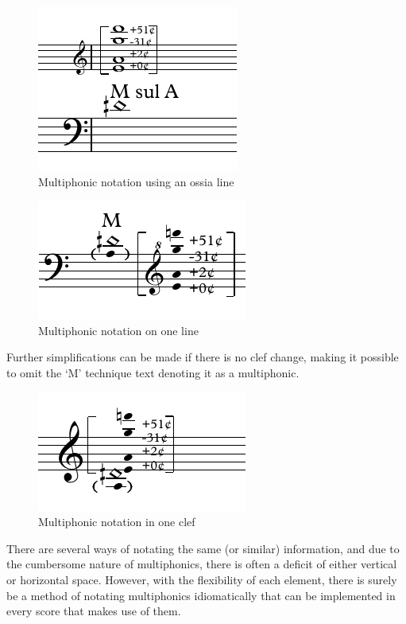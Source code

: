 \begin{figure}
  \centering
  \includegraphics{./resources/multiphonicNotationOssia.pdf}
  \caption{Multiphonic notation using an ossia line}\label{fig:multiphonicNotationOssia}
\end{figure}

\begin{figure}
  \centering
  \includegraphics{./resources/multiphonicNotationOneLine.pdf}
  \caption{Multiphonic notation on one line}\label{fig:multiphonicNotationOneLine}
\end{figure}

Further simplifications can be made if there is no clef change, making it possible to omit the `M' technique text denoting it as a multiphonic.

\begin{figure}
  \centering
  \includegraphics{./resources/multiphonicNotationOneLineClef.pdf}
  \caption{Multiphonic notation in one clef}\label{fig:multiphonicNotationOneLineClef}
\end{figure}

There are several ways of notating the same (or similar) information, and due to the cumbersome nature of multiphonics, there is often a deficit of either vertical or horizontal space.
However, with the flexibility of each element, there is surely be a method of notating multiphonics idiomatically that can be implemented in every score that makes use of them.

